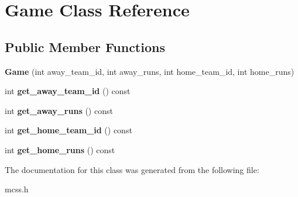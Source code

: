 \hypertarget{classGame}{}\section{Game Class Reference}
\label{classGame}
\subsection*{Public Member Functions}
\begin{DoxyCompactItemize}
\item 
{\bfseries Game} (int away\+\_\+team\+\_\+id, int away\+\_\+runs, int home\+\_\+team\+\_\+id, int home\+\_\+runs)\hypertarget{classGame_ab79f87e04e45eef64d57a0313530962d}{}\label{classGame_ab79f87e04e45eef64d57a0313530962d}

\item 
int {\bfseries get\+\_\+away\+\_\+team\+\_\+id} () const \hypertarget{classGame_ad21cb312d5f4ab0f6d22faf335278b37}{}\label{classGame_ad21cb312d5f4ab0f6d22faf335278b37}

\item 
int {\bfseries get\+\_\+away\+\_\+runs} () const \hypertarget{classGame_a586de24fba929b0f59448e3a2ec46190}{}\label{classGame_a586de24fba929b0f59448e3a2ec46190}

\item 
int {\bfseries get\+\_\+home\+\_\+team\+\_\+id} () const \hypertarget{classGame_a662633faf56feb71711659aedb6c259f}{}\label{classGame_a662633faf56feb71711659aedb6c259f}

\item 
int {\bfseries get\+\_\+home\+\_\+runs} () const \hypertarget{classGame_a23a62a46afc9c9595a20e8dbe897bfd1}{}\label{classGame_a23a62a46afc9c9595a20e8dbe897bfd1}

\end{DoxyCompactItemize}


The documentation for this class was generated from the following file\+:\begin{DoxyCompactItemize}
\item 
mcss.\+h\end{DoxyCompactItemize}
